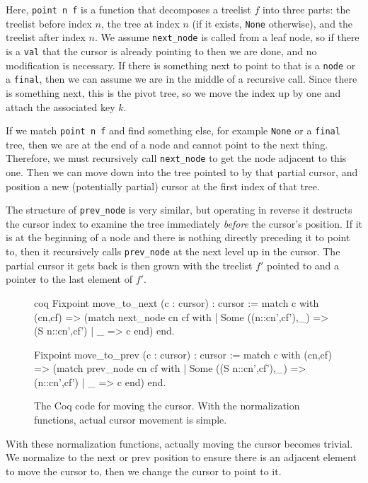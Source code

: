 \documentclass[12pt]{article}
\begin{document}
Here, \texttt{point n f} is a function that decomposes a treelist $f$ into three parts: the treelist before index $n$, the tree at index $n$ (if it exists, \texttt{None} otherwise), and the treelist after index $n$. We assume \texttt{next\_node} is called from a leaf node, so if there is a \texttt{val} that the cursor is already pointing to then we are done, and no modification is necessary. If there is something next to point to that is a \texttt{node} or a \texttt{final}, then we can assume we are in the middle of a recursive call. Since there is something next, this is the pivot tree, so we move the index up by one and attach the associated key $k$.

If we match \texttt{point n f} and find something else, for example \texttt{None} or a \texttt{final} tree, then we are at the end of a node and cannot point to the next thing. Therefore, we must recursively call \texttt{next\_node} to get the node adjacent to this one. Then we can move down into the tree pointed to by that partial cursor, and position a new (potentially partial) cursor at the first index of that tree.

The structure of \texttt{prev\_node} is very similar, but operating in reverse it destructs the cursor index to examine the tree immediately \textit{before} the cursor’s position. If it is at the beginning of a node and there is nothing directly preceding it to point to, then it recursively calls \texttt{prev\_node} at the next level up in the cursor. The partial cursor it gets back is then grown with the treelist $f'$ pointed to and a pointer to the last element of $f'$.

\begin{singlespace}
\begin{figure}[ht]
\centering
\begin{cminted}{coq}
Fixpoint move_to_next (c : cursor) : cursor :=
  match c with (cn,cf) =>
  (match next_node cn cf with
   | Some ((n::cn',cf'),_) => (S n::cn',cf')
   | _ => c
   end)
  end.

Fixpoint move_to_prev (c : cursor) : cursor :=
  match c with (cn,cf) =>
  (match prev_node cn cf with
   | Some ((S n::cn',cf'),_) => (n::cn',cf')
   | _ => c
   end)
  end.
\end{cminted}
\caption{The Coq code for moving the cursor. With the normalization functions, actual cursor movement is simple.}
\end{figure}
\end{singlespace}

With these normalization functions, actually moving the cursor becomes trivial. We normalize to the next or prev position to ensure there is an adjacent element to move the cursor to, then we change the cursor to point to it.
\end{document}

